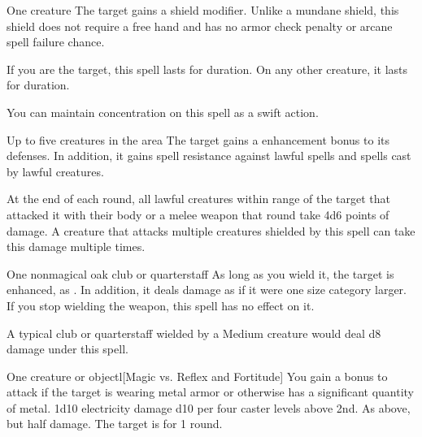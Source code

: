 \spellrng{\rngclose}
\begin{spelltarget}{One creature}
    \spelleffect The target gains a  shield modifier. \spellbonusscalingdescription Unlike a mundane shield, this shield does not require a free hand and has no armor check penalty or arcane spell failure chance.

    \par If you are the target, this spell lasts for \durlong duration. On any other creature, it lasts for \durshort duration.
\end{spelltarget}
\spelleffect You can maintain concentration on this spell as a swift action.

\spelldur{\durshort \dismissable}
\begin{spelltargets}{Up to five creatures in the area}
    The target gains a  enhancement bonus to its defenses. In addition, it gains spell resistance against lawful spells and spells cast by lawful creatures.
    \par At the end of each round, all lawful creatures within \rngclose range of the target that attacked it with their body or a melee weapon that round take 4d6 points of damage. A creature that attacks multiple creatures shielded by this spell can take this damage multiple times.
\end{spelltargets}

\spelldur{\durshort}
\begin{spelltarget}{One nonmagical oak club or quarterstaff}
    \spelleffect As long as you wield it, the target is enhanced, as . In addition, it deals damage as if it were one size category larger. If you stop wielding the weapon, this spell has no effect on it.
\end{spelltarget}
\spellnotes A typical club or quarterstaff wielded by a Medium creature would deal d8 damage under this spell.

\begin{spelltarget}{One creature or object}l[Magic vs. Reflex and Fortitude]
    \spellspecial You gain a  bonus to attack if the target is wearing metal armor or otherwise has a significant quantity of metal.
    \spellsuccess[Reflex] 1d10 electricity damage \add d10 per four caster levels above 2nd.
    \spellfailure[Reflex] As above, but half damage.
     The target is \staggered for 1 round.
\end{spelltarget}

